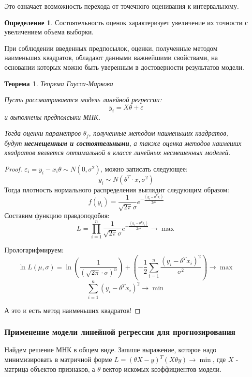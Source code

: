 \documentclass[aps,%
12pt,%
final,%
oneside,
onecolumn,%
musixtex, %
superscriptaddress,%
centertags]{article} %
\theoremstyle{plain}
\newtheorem{theorem}{Теорема}[section] %
\theoremstyle{definition}
\newtheorem{definition}{Определение}[subsection]
\theoremstyle{remark}
\begin{document}
Это означает возможность перехода от точечного оценивания к интервальному.

\begin{definition}
	Состоятельность оценок характеризует увеличение их точности с увеличением объема выборки.
\end{definition}

При соблюдении введенных предпосылок, оценки, полученные методом наименьших квадратов, обладают данными важнейшими свойствами, на основании которых можно быть уверенным в достоверности результатов модели.

\begin{theorem}
	Теорема Гаусса-Маркова

	Пусть рассматривается модель линейной регрессии:
	$$y_i = X\theta + \varepsilon$$
	и выполнены предполсыки МНК. 

	Тогда оценки параметров $\theta_j$, полученные методом наименьших квадратов, будут \textbf{несмещенным и состоятельными}, а также оценка методов наимеших квадратов является \textit{оптимальной} в классе линейных несмешенных моделей.
\end{theorem}

\begin{proof}
	$\varepsilon_i = y_i - x_i \theta \sim N(0, \sigma^2)$, можно записать следующее:
	$$y_i \sim N(\theta^T\cdot x, \sigma^2)$$
	Тогда плотность нормального распределения выглядит следующим образом:
	$$f(y_i) = \frac{1}{\sqrt{2\pi}\sigma}e ^{-\frac{(y_i - \theta^T x_i)}{2\sigma^2}}$$
	Составим функцию правдоподобия:
	$$L =\prod\limits_{i=1}^n \frac{1}{\sqrt{2\pi}\sigma}e ^{-\frac{(y_i - \theta^T x_i)}{2\sigma^2}} \to \max$$

	Прологарифмируем:
	$$\ln L(\mu,\sigma) = \ln \left(\frac{1}{(\sqrt{2\pi}\cdot \sigma)^n}\right) + \left(-\frac{1}{2}\sum\limits_{i=1}^n \frac{(y_i - \theta^Tx_i)^2}{\sigma^2}\right) \to \max$$
	$$\sum\limits_{i=1}^n (y_i - \theta^T x_i)^2 \to \min$$

	А это и есть метод наименьших квадратов!
\end{proof}

\subsubsection{Применение модели линейной регрессии для прогнозирования}

Найдем решение МНК в общем виде. Запише выражение, которое надо минимизировать в матричной форме $L = (\theta X-y)^T(X\theta y) \to \min$, где $X$ - матрица объектов-признаков, а $\theta$-вектор искомых коэффициентов модели.
\end{document}
